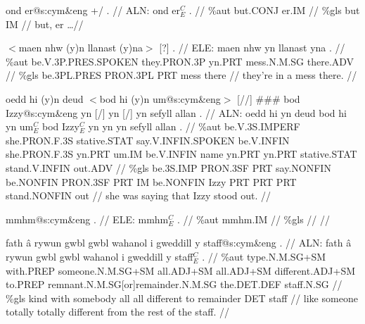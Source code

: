 \documentclass[a4paper,10pt]{article}
\begin{document}
\ex
\begingl[lingstyle=gergl]
\glchat ond er@s:cym\&eng +/ . //
\glsurface ALN:  ond er$^{C}_{E}$ .  //
\glauto \%aut  but{\scriptsize .CONJ} er{\scriptsize .IM}   //
\glmanual \%gls  but IM   //
\gleng but, er \dots  //
\endgl
\xe

\ex
\begingl[lingstyle=gergl]
\glchat $<$maen nhw (y)n llanast (y)na$>$ [?] . //
\glsurface ELE:  maen nhw yn llanast yna .  //
\glauto \%aut  be{\scriptsize .V.3P.PRES.SPOKEN} they{\scriptsize .PRON.3P} yn{\scriptsize .PRT} mess{\scriptsize .N.M.SG} there{\scriptsize .ADV}   //
\glmanual \%gls  be{\scriptsize .3PL.PRES} PRON{\scriptsize .3PL} PRT mess there   //
\gleng they're in a mess there. //
\endgl
\xe

\ex
\begingl[lingstyle=gergl]
\glchat oedd hi (y)n deud $<$bod hi (y)n um@s:cym\&eng$>$ [//] \#\#\# bod Izzy@s:cym\&eng yn [/] yn [/] yn sefyll allan . //
\glsurface ALN:  oedd hi yn deud bod hi yn um$^{C}_{E}$ bod Izzy$^{C}_{E}$ yn yn yn sefyll allan .  //
\glauto \%aut  be{\scriptsize .V.3S.IMPERF} she{\scriptsize .PRON.F.3S} stative{\scriptsize .STAT} say{\scriptsize .V.INFIN.SPOKEN} be{\scriptsize .V.INFIN} she{\scriptsize .PRON.F.3S} yn{\scriptsize .PRT} um{\scriptsize .IM} be{\scriptsize .V.INFIN} name yn{\scriptsize .PRT} yn{\scriptsize .PRT} stative{\scriptsize .STAT} stand{\scriptsize .V.INFIN} out{\scriptsize .ADV}   //
\glmanual \%gls  be{\scriptsize .3S.IMP} PRON{\scriptsize .3SF} PRT say{\scriptsize .NONFIN} be{\scriptsize .NONFIN} PRON{\scriptsize .3SF} PRT IM be{\scriptsize .NONFIN} Izzy PRT PRT PRT stand{\scriptsize .NONFIN} out   //
\gleng she was saying that Izzy stood out. //
\endgl
\xe

\ex
\begingl[lingstyle=gergl]
\glchat mmhm@s:cym\&eng . //
\glsurface ELE:  mmhm$^{C}_{E}$ .  //
\glauto \%aut  mmhm{\scriptsize .IM}   //
\glmanual \%gls     //
\gleng  //
\endgl
\xe

\ex
\begingl[lingstyle=gergl]
\glchat fath â rywun gwbl gwbl wahanol i gweddill y staff@s:cym\&eng . //
\glsurface ALN:  fath â rywun gwbl gwbl wahanol i gweddill y staff$^{C}_{E}$ .  //
\glauto \%aut  type{\scriptsize .N.M.SG+SM} with{\scriptsize .PREP} someone{\scriptsize .N.M.SG+SM} all{\scriptsize .ADJ+SM} all{\scriptsize .ADJ+SM} different{\scriptsize .ADJ+SM} to{\scriptsize .PREP} remnant{\scriptsize .N.M.SG[or]remainder.N.M.SG} the{\scriptsize .DET.DEF} staff{\scriptsize .N.SG}   //
\glmanual \%gls  kind with somebody all all different to remainder DET staff   //
\gleng like someone totally totally different from the rest of the staff. //
\endgl
\xe
\end{document}
